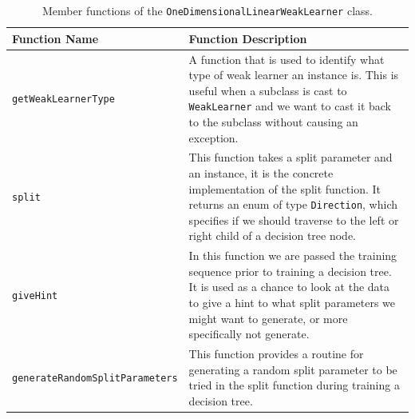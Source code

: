 \documentclass[12pt,twoside,notitlepage]{report}
\begin{document}
                \begin{table}[H]
                    \begin{tabularx}{\textwidth}{l|X}
                        \textbf{Function Name} & \textbf{Function Description} \\
                        \hline

                        \texttt{getWeakLearnerType} & 
                            A function that is used to identify what type of weak learner an instance is. This is 
                            useful when a subclass is cast to \texttt{WeakLearner} and we want to cast it back to 
                            the subclass without causing an exception. \\ 
                        \hline

                        \texttt{split} & 
                            This function takes a split parameter and an instance, it is the concrete implementation 
                            of the split function. It returns an enum of type \texttt{Direction}, which specifies if 
                            we should traverse to the left or right child of a decision tree node. \\ 
                        \hline

                        \texttt{giveHint} & 
                            In this function we are passed the training sequence prior to training a decision tree. 
                            It is used as a chance to look at the data to give a hint to what split parameters we 
                            might want to generate, or more specifically not generate. \\ 
                        \hline

                        \texttt{generateRandomSplitParameters} & 
                            This function provides a routine for generating a random split parameter to be tried in the 
                            split function during training a decision tree. \\ 

                    \end{tabularx}
                    \caption{Member functions of the \texttt{OneDimensionalLinearWeakLearner} class.}
                    \label{tab:OneDimensionalLinearWeakLearner}
                \end{table}
\end{document}
